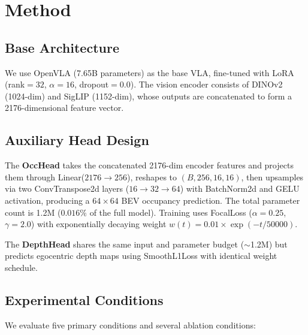 \documentclass[10pt,letterpaper]{article}
\begin{document}
\section{Method}

\subsection{Base Architecture}

We use OpenVLA (7.65B parameters) as the base VLA, fine-tuned with LoRA (rank$=32$, $\alpha=16$, dropout$=0.0$). The vision encoder consists of DINOv2 (1024-dim) and SigLIP (1152-dim), whose outputs are concatenated to form a 2176-dimensional feature vector.

\subsection{Auxiliary Head Design}

The \textbf{OccHead} takes the concatenated 2176-dim encoder features and projects them through Linear($2176 \to 256$), reshapes to $(B, 256, 16, 16)$, then upsamples via two ConvTranspose2d layers ($16 \to 32 \to 64$) with BatchNorm2d and GELU activation, producing a $64 \times 64$ BEV occupancy prediction. The total parameter count is 1.2M ($0.016\%$ of the full model). Training uses FocalLoss ($\alpha=0.25$, $\gamma=2.0$) with exponentially decaying weight $w(t) = 0.01 \times \exp(-t/50000)$.

The \textbf{DepthHead} shares the same input and parameter budget ($\sim$1.2M) but predicts egocentric depth maps using SmoothL1Loss with identical weight schedule.

\subsection{Experimental Conditions}

We evaluate five primary conditions and several ablation conditions:
\end{document}
